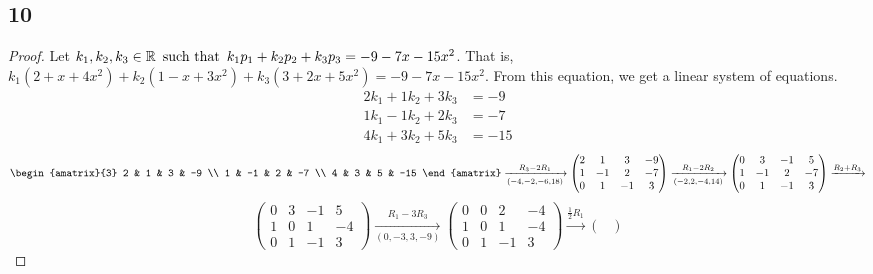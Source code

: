\subsection*{10}
\begin{enumerate}
  \begin{proof}
    Let $k_1,k_2,k_3 \in \mathbb{R} \operatorname{~\text{such that}~} k_1p_1 + k_2p_2 + k_3p_3 = -9-7x-15x^2$. That is, $k_1(2 + x + 4x^2) + k_2(1 - x + 3x^2) + k_3(3 + 2x + 5x^2) = -9-7x-15x^2$. From this equation, we get a linear system of equations.
    \begin{align*}
      2k_1 + 1k_2 + 3k_3 & = -9  \\
      1k_1 - 1k_2 + 2k_3 & = -7  \\
      4k_1 + 3k_2 + 5k_3 & = -15
    \end{align*}
    \[
      \begin{amatrix}{3}
        2 & 1 & 3 & -9 \\
        1 & -1 & 2 & -7 \\
        4 & 3 & 5 & -15
      \end{amatrix} \xrightarrow[(-4,-2,-6,18)]{R_3 - 2R_1}
      \begin{pmatrix}
        2 & 1  & 3  & -9 \\
        1 & -1 & 2  & -7 \\
        0 & 1  & -1 & 3
      \end{pmatrix} \xrightarrow[(-2,2,-4,14)]{R_1 - 2R_2}
      \begin{pmatrix}
        0 & 3  & -1 & 5  \\
        1 & -1 & 2  & -7 \\
        0 & 1  & -1 & 3
      \end{pmatrix} \xrightarrow{R_2 + R_3}
    \]
    \[
      \begin{pmatrix}
        0 & 3 & -1 & 5  \\
        1 & 0 & 1  & -4 \\
        0 & 1 & -1 & 3
      \end{pmatrix} \xrightarrow[(0,-3,3,-9)]{R_1 - 3R_3}
      \begin{pmatrix}
        0 & 0 & 2  & -4 \\
        1 & 0 & 1  & -4 \\
        0 & 1 & -1 & 3
      \end{pmatrix} \xrightarrow{\frac{1}{2}R_1}
      \begin{pmatrix}

\end{pmatrix}\]
\end{proof}
\end{enumerate}
